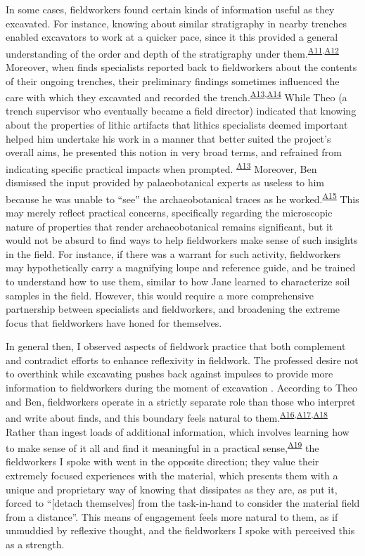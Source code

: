 \documentclass{article}
\begin{document}
In some cases, fieldworkers found certain kinds of information useful as
they excavated. For instance, knowing about similar stratigraphy in
nearby trenches enabled excavators to work at a quicker pace, since it
this provided a general understanding of the order and depth of the
stratigraphy under
them.\textsuperscript{\hyperref[sec-A11]{A11},\hyperref[sec-A12]{A12}}
Moreover, when finds specialists reported back to fieldworkers about the
contents of their ongoing trenches, their preliminary findings sometimes
influenced the care with which they excavated and recorded the
trench.\textsuperscript{\hyperref[sec-A13]{A13},\hyperref[sec-A14]{A14}}
While Theo (a trench supervisor who eventually became a field director)
indicated that knowing about the properties of lithic artifacts that
lithics specialists deemed important helped him undertake his work in a
manner that better suited the project's overall aims, he presented this
notion in very broad terms, and refrained from indicating specific
practical impacts when prompted.
\textsuperscript{\hyperref[sec-A13]{A13}} Moreover, Ben dismissed the
input provided by palaeobotanical experts as useless to him because he
was unable to ``see'' the archaeobotanical traces as he
worked.\textsuperscript{\hyperref[sec-A15]{A15}} This may merely reflect
practical concerns, specifically regarding the microscopic nature of
properties that render archaeobotanical remains significant, but it
would not be absurd to find ways to help fieldworkers make sense of such
insights in the field. For instance, if there was a warrant for such
activity, fieldworkers may hypothetically carry a magnifying loupe and
reference guide, and be trained to understand how to use them, similar
to how Jane learned to characterize soil samples in the field. However,
this would require a more comprehensive partnership between specialists
and fieldworkers, and broadening the extreme focus that fieldworkers
have honed for themselves.

In general then, I observed aspects of fieldwork practice that both
complement and contradict efforts to enhance reflexivity in fieldwork.
The professed desire not to overthink while excavating pushes back
against impulses to provide more information to fieldworkers during the
moment of excavation \parencites[cf.][]{berggren2012,berggren2015}.
According to Theo and Ben, fieldworkers operate in a strictly separate
role than those who interpret and write about finds, and this boundary
feels natural to
them.\textsuperscript{\hyperref[sec-A16]{A16},\hyperref[sec-A17]{A17},\hyperref[sec-A18]{A18}}
Rather than ingest loads of additional information, which involves
learning how to make sense of it all and find it meaningful in a
practical sense,\textsuperscript{\hyperref[sec-A19]{A19}} the
fieldworkers I spoke with went in the opposite direction; they value
their extremely focused experiences with the material, which presents
them with a unique and proprietary way of knowing that dissipates as
they are, as \textcite[109]{edgeworth2003} put it, forced to ``{[}detach
themselves{]} from the task-in-hand to consider the material field from
a distance''. This means of engagement feels more natural to them, as if
unmuddied by reflexive thought, and the fieldworkers I spoke with
perceived this as a strength.
\end{document}

